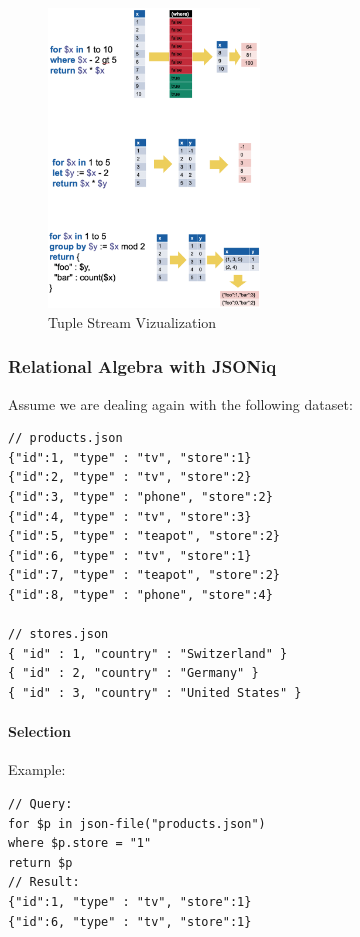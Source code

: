 \begin{figure}[H]
    \centering
    \includegraphics[width=0.5\textwidth]{Figures/TupleStream.png}
    \caption{Tuple Stream Vizualization}\label{fig:TupleStream}
\end{figure}


\subsubsection{Relational Algebra with JSONiq}
Assume we are dealing again with the following dataset:

\begin{lstlisting}[style=json]
// products.json
{"id":1, "type" : "tv", "store":1}
{"id":2, "type" : "tv", "store":2}
{"id":3, "type" : "phone", "store":2}
{"id":4, "type" : "tv", "store":3}
{"id":5, "type" : "teapot", "store":2}
{"id":6, "type" : "tv", "store":1}
{"id":7, "type" : "teapot", "store":2}
{"id":8, "type" : "phone", "store":4}

// stores.json
{ "id" : 1, "country" : "Switzerland" }
{ "id" : 2, "country" : "Germany" }
{ "id" : 3, "country" : "United States" }
\end{lstlisting}

\paragraph{Selection}
Example:
\begin{lstlisting}[style=json]
// Query:
for $p in json-file("products.json")
where $p.store = "1"
return $p
// Result:
{"id":1, "type" : "tv", "store":1}
{"id":6, "type" : "tv", "store":1}
\end{lstlisting}

